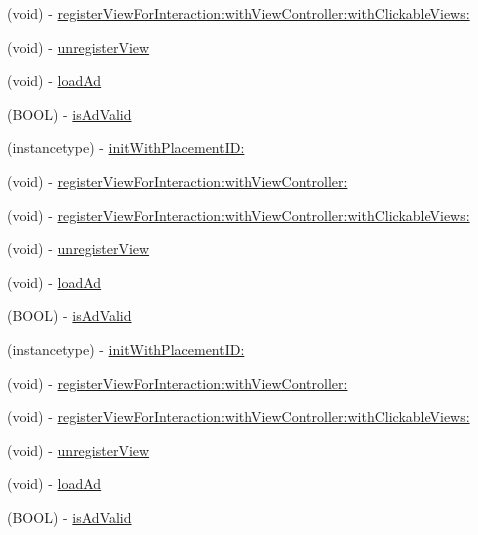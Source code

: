 \begin{DoxyCompactItemize}
(void) -\/ \hyperlink{interfaceFBNativeAd_ab3ebbc3b16c0c0be03becf7fcb204946}{register\+View\+For\+Interaction\+:with\+View\+Controller\+:with\+Clickable\+Views\+:}
\item 
(void) -\/ \hyperlink{interfaceFBNativeAd_af146b825ecd435d8e4de489f6b61dcc2}{unregister\+View}
\item 
(void) -\/ \hyperlink{interfaceFBNativeAd_a943433e6b6c4e4a3d3868203642cda15}{load\+Ad}
\item 
(B\+O\+OL) -\/ \hyperlink{interfaceFBNativeAd_ab7ac5c53be873134d4ad5082e542754d}{is\+Ad\+Valid}
\item 
(instancetype) -\/ \hyperlink{interfaceFBNativeAd_af90f836b1fae6e994657a1d1d3724922}{init\+With\+Placement\+I\+D\+:}
\item 
(void) -\/ \hyperlink{interfaceFBNativeAd_af14f3514ad32a7b1b73ee6e94c1bba16}{register\+View\+For\+Interaction\+:with\+View\+Controller\+:}
\item 
(void) -\/ \hyperlink{interfaceFBNativeAd_ab3ebbc3b16c0c0be03becf7fcb204946}{register\+View\+For\+Interaction\+:with\+View\+Controller\+:with\+Clickable\+Views\+:}
\item 
(void) -\/ \hyperlink{interfaceFBNativeAd_af146b825ecd435d8e4de489f6b61dcc2}{unregister\+View}
\item 
(void) -\/ \hyperlink{interfaceFBNativeAd_a943433e6b6c4e4a3d3868203642cda15}{load\+Ad}
\item 
(B\+O\+OL) -\/ \hyperlink{interfaceFBNativeAd_ab7ac5c53be873134d4ad5082e542754d}{is\+Ad\+Valid}
\item 
(instancetype) -\/ \hyperlink{interfaceFBNativeAd_af90f836b1fae6e994657a1d1d3724922}{init\+With\+Placement\+I\+D\+:}
\item 
(void) -\/ \hyperlink{interfaceFBNativeAd_af14f3514ad32a7b1b73ee6e94c1bba16}{register\+View\+For\+Interaction\+:with\+View\+Controller\+:}
\item 
(void) -\/ \hyperlink{interfaceFBNativeAd_ab3ebbc3b16c0c0be03becf7fcb204946}{register\+View\+For\+Interaction\+:with\+View\+Controller\+:with\+Clickable\+Views\+:}
\item 
(void) -\/ \hyperlink{interfaceFBNativeAd_af146b825ecd435d8e4de489f6b61dcc2}{unregister\+View}
\item 
(void) -\/ \hyperlink{interfaceFBNativeAd_a943433e6b6c4e4a3d3868203642cda15}{load\+Ad}
\item 
(B\+O\+OL) -\/ \hyperlink{interfaceFBNativeAd_ab7ac5c53be873134d4ad5082e542754d}{is\+Ad\+Valid}
\end{DoxyCompactItemize}
